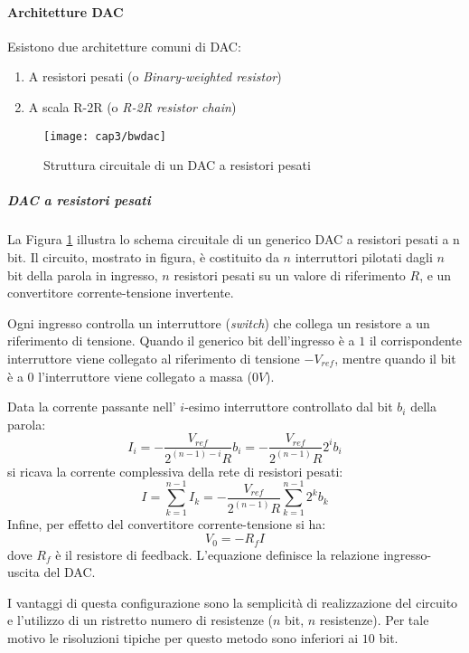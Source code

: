 \paragraph{Architetture DAC}
Esistono due architetture comuni di DAC:
\begin{enumerate}
	\item A resistori pesati (o \textit{Binary-weighted resistor})
	\item A scala R-2R (o \textit{R-2R resistor chain})
\end{enumerate}
\begin{figure}  
  \begin{center}
    \texttt{[image: cap3/bwdac]}
    \caption{Struttura circuitale di un DAC a resistori pesati}
    \label{bwdac}
  \end{center}
\end{figure}
\subparagraph{\textbf{DAC a resistori pesati}} La Figura \ref{bwdac} illustra lo schema circuitale di un generico DAC a resistori pesati a n bit.
Il circuito, mostrato in figura, è costituito da $n$ interruttori pilotati dagli $n$ bit della parola in ingresso, $n$ resistori pesati su un valore di riferimento $R$, e un convertitore corrente-tensione invertente.

Ogni ingresso controlla un interruttore (\textit{switch}) che collega un resistore a un riferimento di tensione. Quando il generico bit dell'ingresso è a $1$ il corrispondente interruttore viene collegato al riferimento di tensione $-V_{ref}$, mentre quando il bit è a $0$ l'interruttore viene collegato a massa ($0 V$).

Data la corrente passante nell' $i$-esimo interruttore controllato dal bit $b_i$ della parola:
\begin{equation}
	I_i=-\frac{V_{ref}}{2^{(n-1)-i}R}b_i = -\frac{V_{ref}}{2^{(n-1)}R}2^ib_i
\end{equation}
si ricava la corrente complessiva della rete di resistori pesati:
\begin{equation}
	I = \sum_{k=1}^{n-1} I_k = -\frac{V_{ref}}{2^{(n-1)}R} \sum_{k=1}^{n-1} 2^k b_k 
\end{equation}
Infine, per effetto del convertitore corrente-tensione si ha:
\begin{equation}
	V_0 = -R_f I
\end{equation}
dove $R_f$ è il resistore di feedback. L'equazione definisce la relazione ingresso-uscita del DAC.

I vantaggi di questa configurazione sono la semplicità di realizzazione del circuito e l'utilizzo di un ristretto numero di resistenze ($n$ bit, $n$ resistenze). Per tale motivo le risoluzioni tipiche per questo metodo sono inferiori ai $10$ bit.

